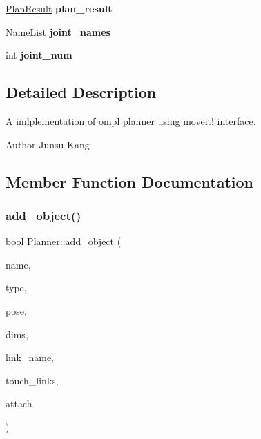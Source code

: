 \begin{DoxyCompactItemize}
\hyperlink{struct_r_n_b_1_1_moveit_compact_1_1_plan_result}{Plan\+Result} {\bfseries plan\+\_\+result}
\item 
\mbox{\label{class_r_n_b_1_1_moveit_compact_1_1_planner_a1cfaa56d941bd138cad2f9665602aca5}} 
Name\+List {\bfseries joint\+\_\+names}
\item 
\mbox{\label{class_r_n_b_1_1_moveit_compact_1_1_planner_a9d5e839298cc00cbef7fc53155407531}} 
int {\bfseries joint\+\_\+num}
\end{DoxyCompactItemize}


\subsection{Detailed Description}
A imlplementation of ompl planner using moveit! interface. 

\begin{DoxyAuthor}{Author}
Junsu Kang 
\end{DoxyAuthor}


\subsection{Member Function Documentation}
\mbox{\label{class_r_n_b_1_1_moveit_compact_1_1_planner_a89a057666f1c30a49d5219879107b435}} 
\subsubsection{\texorpdfstring{add\+\_\+object()}{add\_object()}}
{\footnotesize\ttfamily bool Planner\+::add\+\_\+object (\begin{DoxyParamCaption}\item[{string}]{name,  }\item[{const Object\+Type}]{type,  }\item[{\hyperlink{class_r_n_b_1_1_moveit_compact_1_1_cart_pose}{Cart\+Pose}}]{pose,  }\item[{Vec3}]{dims,  }\item[{string}]{link\+\_\+name,  }\item[{Name\+List}]{touch\+\_\+links,  }\item[{bool}]{attach }\end{DoxyParamCaption})}



